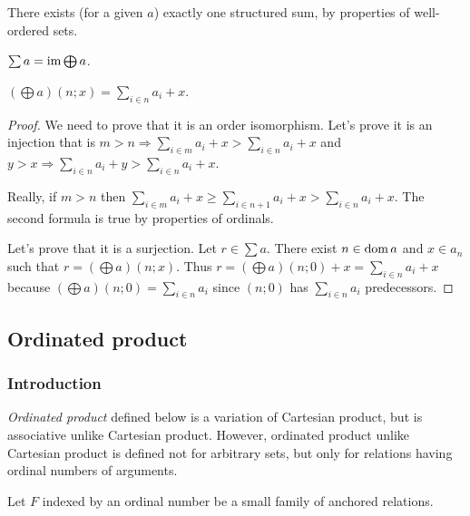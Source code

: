 There exists (for a given $a$) exactly one structured sum, by properties
of well-ordered sets.
\begin{obvious}
$\sum a=\operatorname{im}\bigoplus a$.\end{obvious}
\begin{thm}
$\left(\bigoplus a\right)(n;x)=\sum_{i\in n}a_{i}+x$.\end{thm}
\begin{proof}
We need to prove that it is an order isomorphism. Let's prove it is
an injection that is $m>n\Rightarrow\sum_{i\in m}a_{i}+x>\sum_{i\in n}a_{i}+x$
and $y>x\Rightarrow\sum_{i\in n}a_{i}+y>\sum_{i\in n}a_{i}+x$.

Really, if $m>n$ then $\sum_{i\in m}a_{i}+x\geq\sum_{i\in n+1}a_{i}+x>\sum_{i\in n}a_{i}+x$.
The second formula is true by properties of ordinals.

Let's prove that it is a surjection. Let $r\in\sum a$. There exist
$n\in\operatorname{dom} a$ and $x\in a_{n}$ such that $r=\left(\bigoplus a\right)(n;x)$.
Thus $r=\left(\bigoplus a\right)(n;0)+x=\sum_{i\in n}a_{i}+x$ because
$\left(\bigoplus a\right)(n;0)=\sum_{i\in n}a_{i}$ since $(n;0)$
has $\sum_{i\in n}a_{i}$ predecessors.
\end{proof}

\subsection{\label{ordinated-prod}Ordinated product}


\subsubsection{Introduction}

\emph{Ordinated product} defined below is a variation of Cartesian
product, but is associative unlike Cartesian product. However, ordinated
product unlike Cartesian product is defined not for arbitrary sets,
but only for relations having ordinal numbers of arguments.

Let $F$ indexed by an ordinal number be a small family of anchored
relations.


